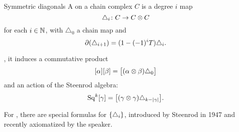 \begin{frame}{}
	\vspace*{2.3cm}
	\begin{center}
		\huge{}
	\end{center}
\end{frame}

\begin{frame}{Symmetric diagonals}
	\pause
	A  on a chain complex $C$ is a degree $i$ map
	\[
	\triangle_i \colon C \to C \otimes C
	\]
	for each $i \in \mathbb{N}$, with $\triangle_0$ a chain map and
	\[
	\partial (\triangle_{i+1}) = (1-(-1)^iT) \triangle_i.
	\]
	
	\pause\medskip
	, it induces a commutative product
	\[
	[\alpha][\beta] = \big[(\alpha \otimes \beta)\triangle_0\big]
	\]
	and an action of the Steenrod algebra:
	\[
	\operatorname{Sq}^k[\gamma] = \big[(\gamma \otimes \gamma)\triangle_{k-\lvert\gamma\rvert}\big].
	\]
	
	\pause\medskip
	For , there are special formulas for $\{\triangle_i\}$, introduced by Steenrod in 1947 and recently axiomatized by the speaker.
\end{frame}

